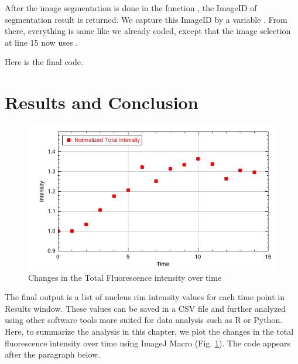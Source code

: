 After the image segmentation is done in the function , the ImageID of segmentation result is returned. We capture this ImageID by a variable . From there, everything is same like we already coded, except that the image selection at line 15 now uses .  

Here is the final code. 

 


\section{Results and Conclusion}

\begin{figure}[h!]
\begin{center}
\includegraphics[scale=0.4]{fig/totalIntensityPlot.png}
\caption{Changes in the Total Fluorescence intensity over time}
\label{fig:FluorescenceChangeOvertime}
\end{center}
\end{figure}

The final output is a list of nucleus rim intensity values for each time point in Results window. These values can be saved in a CSV file and further analyzed using other software tools more suited for data analysis such as R or Python. Here, to summarize the analysis in this chapter, we plot the changes in the total fluorescence intensity over time using ImageJ Macro  (Fig. \ref{fig:FluorescenceChangeOvertime}). The code appears after the paragraph below. 

